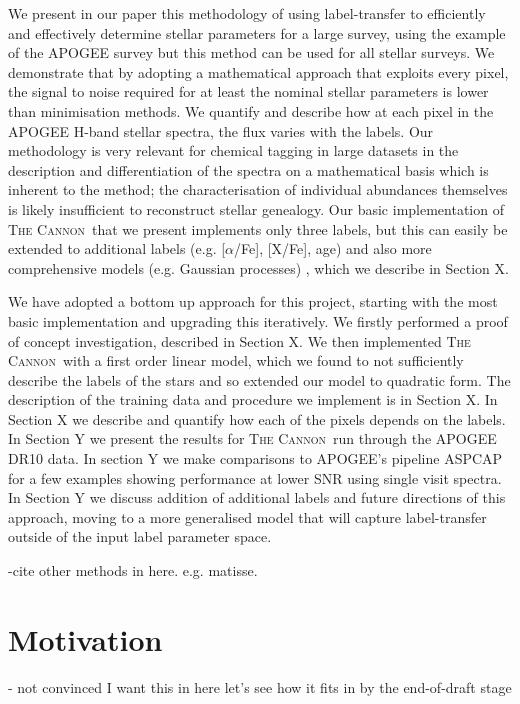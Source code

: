 \documentclass[12pt, preprint]{aastex}
\newcommand{\tc}{\textsc{The Cannon}}
\begin{document}
We present in our paper this methodology of using label-transfer to efficiently and effectively determine stellar parameters for a large survey, using the example of the APOGEE survey but this method can be used for all stellar surveys. We demonstrate that by adopting a mathematical approach that exploits every pixel, the signal to noise required for at least the nominal stellar parameters is lower than minimisation methods. We quantify and describe how at each pixel in the APOGEE H-band stellar spectra, the flux varies with the labels. Our methodology is very relevant for chemical tagging in large datasets in the description and differentiation of the spectra on a mathematical basis which is inherent to the method; the characterisation of individual abundances themselves is likely insufficient to reconstruct stellar genealogy.  Our basic implementation of \tc\ that we present implements only three labels, but this can easily be extended to additional labels  (e.g. [$\alpha$/Fe], [X/Fe], age) and also more comprehensive models (e.g. Gaussian processes) , which we describe in Section X. %

We have adopted a bottom up approach for this project, starting with the most basic implementation and upgrading this iteratively. We firstly performed a proof of concept investigation, described in Section X. We then implemented \tc\ with a first order linear model, which we found to not  sufficiently describe the labels of the stars and so extended our model to quadratic form. The description of the training data and procedure we implement is in Section X. In Section X we describe and quantify how each of the pixels depends on the labels. In Section Y we present the results for \tc\ run through the APOGEE DR10 data. In section Y we make comparisons to APOGEE's pipeline ASPCAP for a few examples showing performance at lower SNR using single visit spectra. In Section Y we discuss addition of additional labels and future directions of this approach, moving to a more generalised model that will capture label-transfer outside of the input label parameter space. 

-cite other methods in here. e.g. matisse. 



\section{Motivation}

- not convinced I want this in here let's see how it fits in by the end-of-draft stage
\end{document}

